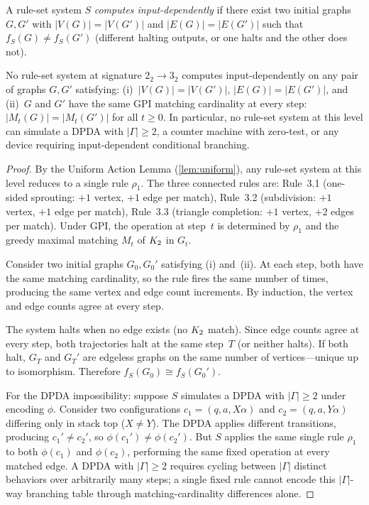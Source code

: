 \documentclass{../shared/primo}
\begin{document}
\begin{definition}\label{def:inputdep}
A rule-set system $S$ \emph{computes input-dependently} if there exist two initial graphs $G, G'$ with $|V(G)| = |V(G')|$ and $|E(G)| = |E(G')|$ such that $f_S(G) \neq f_S(G')$ (different halting outputs, or one halts and the other does not).
\end{definition}

\begin{theorem}\label{thm:unconditional-body}
No rule-set system at signature $2_2 \to 3_2$ computes input-dependently on any pair of graphs $G, G'$ satisfying: \textup{(i)}~$|V(G)| = |V(G')|$, $|E(G)| = |E(G')|$, and \textup{(ii)}~$G$ and $G'$ have the same GPI matching cardinality at every step: $|M_t(G)| = |M_t(G')|$ for all $t \geq 0$. In particular, no rule-set system at this level can simulate a DPDA with $|\Gamma| \geq 2$, a counter machine with zero-test, or any device requiring input-dependent conditional branching.
\end{theorem}

\begin{proof}
By the Uniform Action Lemma (\cref{lem:uniform}), any rule-set system at this level reduces to a single rule $\rho_1$. The three connected rules are: Rule~3.1 (one-sided sprouting: $+1$ vertex, $+1$ edge per match), Rule~3.2 (subdivision: $+1$ vertex, $+1$ edge per match), Rule~3.3 (triangle completion: $+1$ vertex, $+2$ edges per match). Under GPI, the operation at step~$t$ is determined by $\rho_1$ and the greedy maximal matching $M_t$ of $K_{2}$ in $G_t$.

Consider two initial graphs $G_0, G_0'$ satisfying (i) and~(ii). At each step, both have the same matching cardinality, so the rule fires the same number of times, producing the same vertex and edge count increments. By induction, the vertex and edge counts agree at every step.

The system halts when no edge exists (no $K_{2}$ match). Since edge counts agree at every step, both trajectories halt at the same step~$T$ (or neither halts). If both halt, $G_T$ and $G_T'$ are edgeless graphs on the same number of vertices---unique up to isomorphism. Therefore $f_S(G_0) \cong f_S(G_0')$.

For the DPDA impossibility: suppose $S$ simulates a DPDA with $|\Gamma| \geq 2$ under encoding $\phi$. Consider two configurations $c_1 = (q, a, X\alpha)$ and $c_2 = (q, a, Y\alpha)$ differing only in stack top ($X \neq Y$). The DPDA applies different transitions, producing $c_1' \neq c_2'$, so $\phi(c_1') \neq \phi(c_2')$. But $S$ applies the same single rule $\rho_1$ to both $\phi(c_1)$ and $\phi(c_2)$, performing the same fixed operation at every matched edge. A DPDA with $|\Gamma| \geq 2$ requires cycling between $|\Gamma|$ distinct behaviors over arbitrarily many steps; a single fixed rule cannot encode this $|\Gamma|$-way branching table through matching-cardinality differences alone.
\end{proof}
\end{document}
